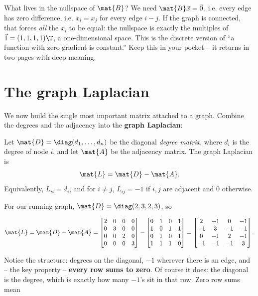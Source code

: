 What lives in the nullspace of $\mat{B}$? We need $\mat{B}\vec{x} = \vec{0}$, i.e. every
edge has zero difference, i.e. $x_i = x_j$ for every edge $i\!-\!j$. If the graph is
connected, that forces \emph{all} the $x_i$ to be equal: the nullspace is exactly the
multiples of $\vec{1} = (1,1,1,1)\T$, a one-dimensional space. This is the discrete version
of ``a function with zero gradient is constant.'' Keep this in your pocket -- it returns in
two pages with deep meaning.

\section{The graph Laplacian}
\label{ch35:laplacian}

We now build the single most important matrix attached to a graph. Combine the degrees and
the adjacency into the \textbf{graph Laplacian}:

\begin{definition}
\label{ch35:def-laplacian}
Let $\mat{D} = \diag(d_1,\dots,d_n)$ be the diagonal \emph{degree matrix}, where $d_i$ is
the degree of node $i$, and let $\mat{A}$ be the adjacency matrix. The graph Laplacian is
\[
\mat{L} = \mat{D} - \mat{A}.
\]
Equivalently, $L_{ii} = d_i$, and for $i \ne j$, $L_{ij} = -1$ if $i,j$ are adjacent and
$0$ otherwise.
\end{definition}

For our running graph, $\mat{D} = \diag(2,3,2,3)$, so

\[
\mat{L} = \mat{D} - \mat{A} =
\begin{bmatrix}2&0&0&0\\0&3&0&0\\0&0&2&0\\0&0&0&3\end{bmatrix}
-
\begin{bmatrix}0&1&0&1\\1&0&1&1\\0&1&0&1\\1&1&1&0\end{bmatrix}
=
\begin{bmatrix}
2 & -1 & 0 & -1\\
-1 & 3 & -1 & -1\\
0 & -1 & 2 & -1\\
-1 & -1 & -1 & 3
\end{bmatrix}.
\]

Notice the structure: degrees on the diagonal, $-1$ wherever there is an edge, and -- the
key property -- \textbf{every row sums to zero}. Of course it does: the diagonal is the
degree, which is exactly how many $-1$'s sit in that row. Zero row sums mean


